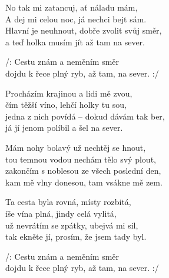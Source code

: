 
\ve{}
No tak mi zatancuj, ať náladu mám,\\
A dej mi celou noc, já nechci bejt sám.\\
Hlavní je neuhnout, dobře zvolit svůj směr,\\
a teď holka musím jít až tam na sever.

\cho{}
/: Cestu znám a neměním směr\\
dojdu k řece plný ryb, až tam, na sever. :/

\ve{}
Procházím krajinou a lidi mě zvou,\\
čím těžší víno, lehčí holky tu sou,\\
jedna z nich povídá -- dokud dávám tak ber,\\
já jí jenom políbil a šel na sever.

\cho{}

\ve{}
Mám nohy bolavý už nechtěj se hnout,\\
tou temnou vodou nechám tělo svý plout,\\
zakončím s noblesou ze všech poslední den,\\
kam mě vlny donesou, tam vsákne mě zem.

\cho{}

\re{*:}
Ta cesta byla rovná, místy rozbitá,\\
íše vína plná, jindy celá vylitá,\\
už nevrátím se zpátky, ubejvá mi sil,\\
tak ekněte jí, prosím, že jsem tady byl.

\cho{}
/: Cestu znám a neměním směr\\
dojdu k řece plný ryb, až tam, na sever. :/

\esong